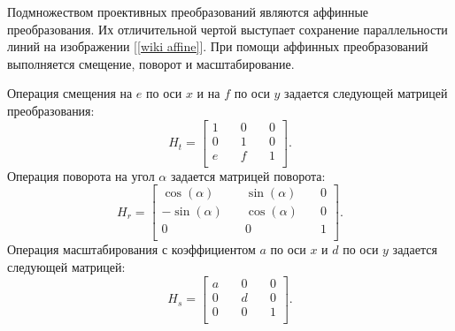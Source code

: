 {{	Подмножеством проективных преобразований являются аффинные преобразования. Их отличительной чертой выступает сохранение параллельности линий на изображении [\ref{wiki affine}]. При помощи аффинных преобразований выполняется смещение, поворот и масштабирование. 
	
	Операция смещения на $e$ по оси $x$ и на $f$ по оси $y$ задается следующей матрицей преобразования:
	$$
	H_t = 
	\begin{bmatrix}
	1 &\quad 0 &\quad 0 \\
	0 &\quad 1 &\quad 0 \\
	e &\quad f &\quad 1 \\
	\end{bmatrix}.
	$$
	Операция поворота на угол $\alpha$ задается матрицей поворота:
	$$
	H_r = 
	\begin{bmatrix}
	\cos(\alpha) &\quad \sin(\alpha) &\quad 0 \\
	-\sin(\alpha) &\quad \cos(\alpha) &\quad 0 \\
	0 &\quad 0 &\quad 1 \\
	\end{bmatrix}.
	$$
	Операция масштабирования с коэффициентом $a$ по оси $x$ и $d$ по оси $y$ задается следующей матрицей:
	$$
	H_s = 
	\begin{bmatrix}
	a &\quad 0 &\quad 0 \\
	0 &\quad d &\quad 0 \\
	0 &\quad 0 &\quad 1 \\
	\end{bmatrix}.
	$$  		
	
}}
